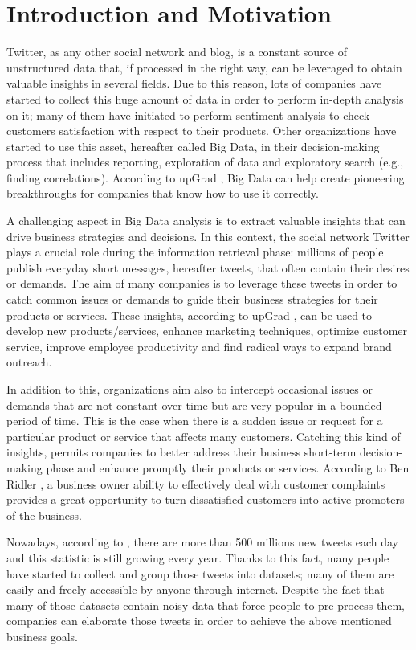 \section{Introduction and Motivation}
\label{sec:introduction}
Twitter, as any other social network and blog, is a constant source of unstructured data that, if processed in the right way, can be leveraged to obtain valuable insights in several fields. Due to this reason, lots of companies have started to collect this huge amount of data in order to perform in-depth analysis on it; many of them have initiated to perform sentiment analysis to check customers satisfaction with respect to their products. Other organizations have started to use this asset, hereafter called Big Data, in their decision-making process that includes reporting, exploration of data and exploratory search (e.g., finding correlations). According to upGrad \cite{upGrad}, Big Data can help create pioneering breakthroughs for companies that know how to use it correctly.

A challenging aspect in Big Data analysis is to extract valuable insights that can drive business strategies and decisions. In this context, the social network Twitter plays a crucial role during the information retrieval phase: millions of people publish everyday short messages, hereafter tweets, that often contain their desires or demands. The aim of many companies is to leverage these tweets in order to catch common issues or demands to guide their business strategies for their products or services. These insights, according to upGrad \cite{upGrad}, can be used to develop new products/services, enhance marketing techniques, optimize customer service, improve employee productivity and find radical ways to expand brand outreach.

In addition to this, organizations aim also to intercept occasional issues or demands that are not constant over time but are very popular in a bounded period of time. This is the case when there is a sudden issue or request for a particular product or service that affects many customers. Catching this kind of insights, permits companies to better address their business short-term decision-making phase and enhance promptly their products or services. According to Ben Ridler \cite{customer-satistaction}, a business owner ability to effectively deal with customer complaints provides a great opportunity to turn dissatisfied customers into active promoters of the business.

Nowadays, according to \cite{twitter-stats}, there are more than 500 millions new tweets each day and this statistic is still growing every year. Thanks to this fact, many people have started to collect and group those tweets into datasets; many of them are easily and freely accessible by anyone through internet. Despite the fact that many of those datasets contain noisy data that force people to pre-process them, companies can elaborate those tweets in order to achieve the above mentioned business goals.


